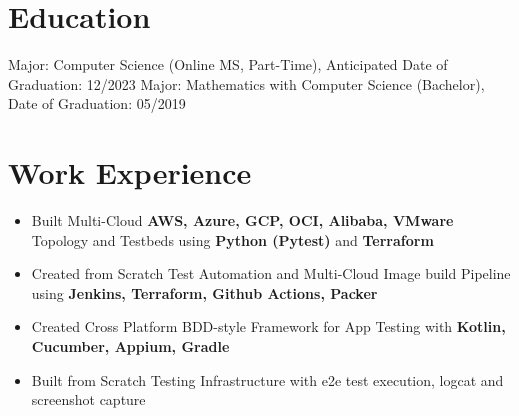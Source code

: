 \documentclass{resume}
\begin{document}
\section{Education}
Major: Computer Science (Online MS, Part-Time), Anticipated Date of Graduation:
12/2023
Major: Mathematics with Computer Science (Bachelor), Date of Graduation:
05/2019
\section{Work Experience}
\begin{itemize}
\item Built Multi-Cloud \textbf{AWS, Azure, GCP, OCI, Alibaba, VMware} Topology and Testbeds using \textbf{Python (Pytest)} and \textbf{Terraform}
\item Created from Scratch Test Automation and Multi-Cloud Image build Pipeline using \textbf{Jenkins, Terraform, Github Actions, Packer}
\end{itemize}
\begin{itemize}
\item Created Cross Platform BDD-style Framework for App Testing with \textbf{Kotlin, Cucumber, Appium, Gradle}
\item Built from Scratch Testing Infrastructure with e2e test execution, logcat and screenshot capture
\end{itemize}
\end{document}
